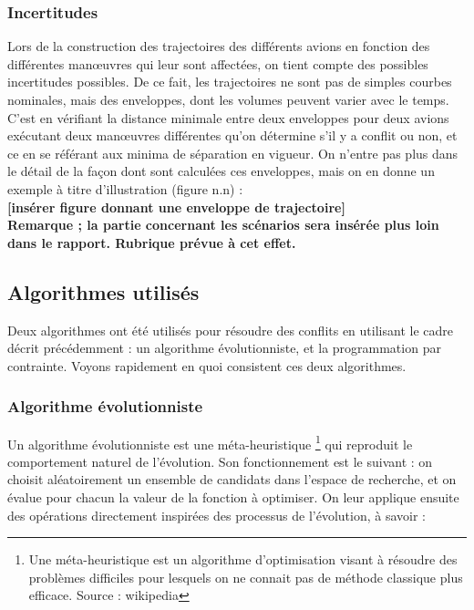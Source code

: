 \subsubsection*{Incertitudes}

Lors de la construction des trajectoires des différents avions en fonction des différentes manœuvres qui leur sont affectées, on tient compte des possibles incertitudes possibles. De ce fait, les trajectoires ne sont pas de simples courbes nominales, mais des enveloppes, dont les volumes peuvent varier avec le temps. C'est en vérifiant la distance minimale entre deux enveloppes pour deux avions exécutant deux manœuvres différentes qu'on détermine s'il y a conflit ou non, et ce en se référant aux minima de séparation en vigueur. On n'entre pas plus dans le détail de la façon dont sont calculées ces enveloppes, mais on en donne un exemple à titre d'illustration (figure n.n) : \\

\textbf{[insérer figure donnant une enveloppe de trajectoire]} \\

\textbf{Remarque ; la partie concernant les scénarios sera insérée plus loin dans le rapport. Rubrique prévue à cet effet.}


\subsection{Algorithmes utilisés}

Deux algorithmes ont été utilisés pour résoudre des conflits en utilisant le cadre décrit précédemment : un algorithme évolutionniste, et la programmation par contrainte. Voyons rapidement en quoi consistent ces deux algorithmes.

\subsubsection*{Algorithme évolutionniste}

Un algorithme évolutionniste est une méta-heuristique \footnote{Une méta-heuristique est un algorithme d'optimisation visant à résoudre des problèmes difficiles pour lesquels on ne connait pas de méthode classique plus efficace. Source : wikipedia } qui reproduit le comportement naturel de l'évolution. Son fonctionnement est le suivant : on choisit aléatoirement un ensemble de candidats dans l'espace de recherche, et on évalue pour chacun la valeur de la fonction à optimiser. On leur applique ensuite des opérations directement inspirées des processus de l'évolution, à savoir :

